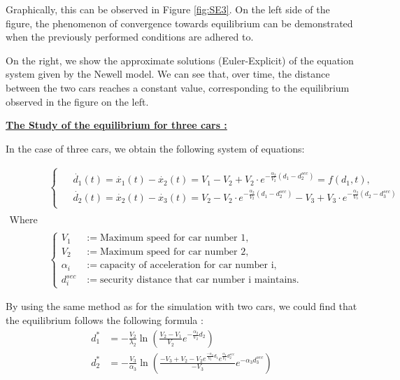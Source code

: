 \documentclass{article}
\begin{document}
		Graphically, this can be observed in Figure \ref{fig:SE3}. On the left side of the figure, the phenomenon of convergence towards equilibrium can be demonstrated when the previously performed conditions are adhered to.
	
	On the right, we show the approximate solutions (Euler-Explicit) of the equation system given by the Newell model. We can see that, over time, the distance between the two cars reaches a constant value, corresponding to the equilibrium observed in the figure on the left. \newline\newline
	
	\textbf{\underline{The Study of the equilibrium for three cars : }} \newline\newline
	
	In the case of three cars, we obtain the following system of equations:
	
	
	\begin{align*}
		&\begin{cases}
			\begin{aligned}
				&\dot{d_1}(t) = \dot{x_1}(t) - \dot{x_2}(t) = V_1 - V_2 + V_2 \cdot e^{-\frac{\alpha_2}{V_2}(d_1 - d_{2}^{sec})} = f(d_1, t), \\
				&\dot{d_2}(t) = \dot{x_2}(t)-\dot{x_3}(t) = V_2 - V_2 \cdot e^{-\frac{\alpha_2}{V_2}(d_1 - d_{2}^{sec})} - V_3 + V_3 \cdot e^{-\frac{\alpha_3}{V_3}(d_2 - d_{3}^{sec})}
			\end{aligned}
		\end{cases}
		 \\ \\
		 \text{Where : } \\ \\
		&\left\{
		\begin{aligned}
			V_1 &:= \text{Maximum speed for car number 1}, \\
			V_2 &:= \text{Maximum speed for car number 2}, \\
			\alpha_i &:= \text{capacity of acceleration for car number i}, \\
			d_{i}^{sec} &:= \text{security distance that car number i maintains}.
		\end{aligned}
		\right.
	\end{align*}
	
	By using the same method as for the simulation with two cars, we could find that the equilibrium follows the following formula :
	\begin{align*}
		d_1^* &= -\frac{V_2}{\lambda_2}\ln \left(\frac{V_2-V_1}{V_2}e^{-\frac{\alpha_2}{V_2}d_2} \right) \\
		d_2^* &= -\frac{V_3}{\alpha_3}\ln \left(\frac{-V_3+V_2-V_2e^{\frac{-\alpha_2}{V_2}d_1}e^{\frac{\alpha_2}{V_2}d_2^{sec}}}{-V_3}e^{-\alpha_3 d_3^{sec}} \right)
	\end{align*}
	
\end{document}
